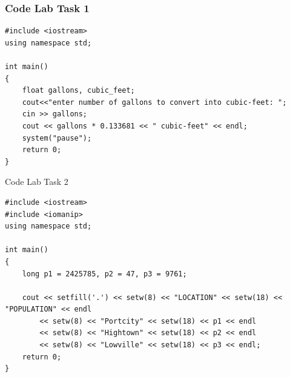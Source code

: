 \documentclass{beamer}
\begin{document}
%	
%	
%	
%	

\begin{frame}[fragile, label=supplemental]
	\frametitle{Code Lab Task 1}
	\lstset{style=mystyle}
        \begin{lstlisting}
#include <iostream>
using namespace std;

int main()
{
	float gallons, cubic_feet;
	cout<<"enter number of gallons to convert into cubic-feet: ";
	cin >> gallons;
	cout << gallons * 0.133681 << " cubic-feet" << endl;
	system("pause");
	return 0;
}\end{lstlisting}
\hyperlink{main}{}
\end{frame}

\begin{frame}[label=ltcode, fragile]{Code Lab Task 2}
\lstset{style=mystyle}
        \begin{lstlisting}
#include <iostream>
#include <iomanip>
using namespace std;

int main()
{
    long p1 = 2425785, p2 = 47, p3 = 9761;
    
    cout << setfill('.') << setw(8) << "LOCATION" << setw(18) << "POPULATION" << endl 
		<< setw(8) << "Portcity" << setw(18) << p1 << endl 
		<< setw(8) << "Hightown" << setw(18) << p2 << endl 
		<< setw(8) << "Lowville" << setw(18) << p3 << endl;
    return 0;
}\end{lstlisting}
\hyperlink{lt2}{}

	
\end{frame}
\end{document}
